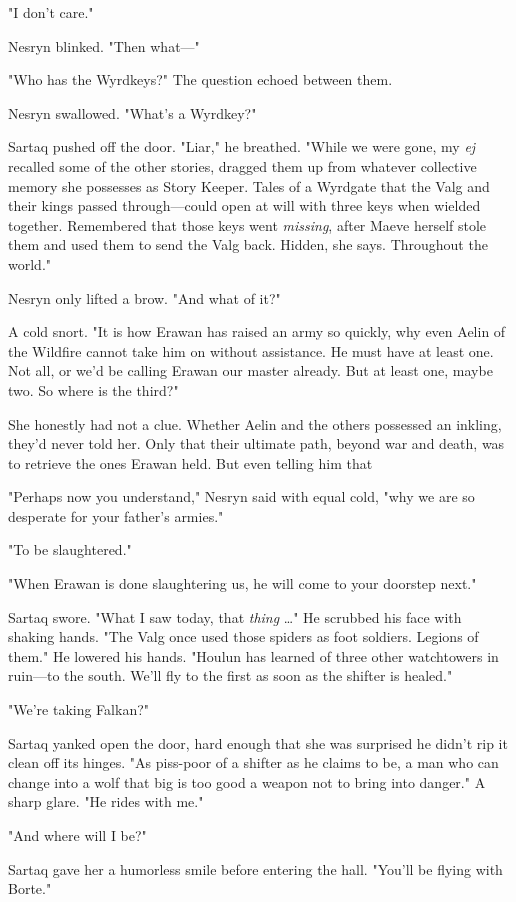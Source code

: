 "I don't care."

Nesryn blinked.
"Then what---"

"Who has the Wyrdkeys?"
The question echoed between them.

Nesryn swallowed.
"What's a Wyrdkey?"

Sartaq pushed off the door.
"Liar," he breathed.
"While we were gone, my \emph{ej} recalled some of the other stories, dragged them up from whatever collective memory she possesses as Story Keeper.
Tales of a Wyrdgate that the Valg and their kings passed through---could open at will with three keys when wielded together.
Remembered that those keys went \emph{missing}, after Maeve herself stole them and used them to send the Valg back.
Hidden, she says.
Throughout the world."

Nesryn only lifted a brow.
"And what of it?"

A cold snort.
"It is how Erawan has raised an army so quickly, why even Aelin of the Wildfire cannot take him on without assistance.
He must have at least one.
Not all, or we'd be calling Erawan our master already.
But at least one, maybe two.
So where is the third?"

She honestly had not a clue.
Whether Aelin and the others possessed an inkling, they'd never told her.
Only that their ultimate path, beyond war and death, was to retrieve the ones Erawan held.
But even telling him that 

"Perhaps now you understand," Nesryn said with equal cold, "why we are so desperate for your father's armies."

"To be slaughtered."

"When Erawan is done slaughtering us, he will come to your doorstep next."

Sartaq swore.
"What I saw today, that \emph{thing} \ldots" He scrubbed his face with shaking hands.
"The Valg once used those spiders as foot soldiers.
Legions of them."
He lowered his hands.
"Houlun has learned of three other watchtowers in ruin---to the south.
We'll fly to the first as soon as the shifter is healed."

"We're taking Falkan?"

Sartaq yanked open the door, hard enough that she was surprised he didn't rip it clean off its hinges.
"As piss-poor of a shifter as he claims to be, a man who can change into a wolf that big is too good a weapon not to bring into danger."
A sharp glare.
"He rides with me."

"And where will I be?"

Sartaq gave her a humorless smile before entering the hall.
"You'll be flying with Borte."

